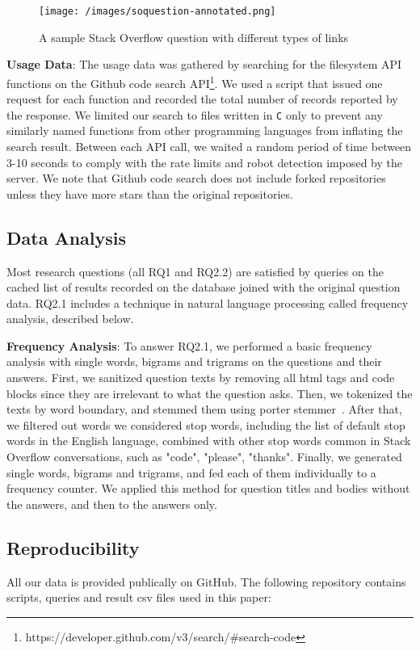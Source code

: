 \begin{figure}[t!]
  \texttt{[image: /images/soquestion-annotated.png]}
  \caption{A sample Stack Overflow question with different types of links}
  \label{fig:soq}
\end{figure}

\textbf{Usage Data}: The usage data was gathered by searching for the filesystem API functions on the Github code search API\footnote{https://developer.github.com/v3/search/\#search-code}. We used a script that issued one request for each function and recorded the total number of records reported by the response. We limited our search to files written in \texttt{C} only to prevent any similarly named functions from other programming languages from inflating the search result. Between each API call, we waited a random period of time between 3-10 seconds to comply with the rate limits and robot detection imposed by the server. We note that Github code search does not include forked repositories unless they have more stars than the original repositories.

\subsection{Data Analysis}\label{subsec:analysis}
Most research questions (all RQ1 and RQ2.2) are satisfied by queries on the cached list of results recorded on the database joined with the original question data. RQ2.1 includes a technique in natural language processing called frequency analysis, described below.

\textbf{Frequency Analysis}: To answer RQ2.1, we performed a basic frequency analysis with single words, bigrams and trigrams on the questions and their answers. First, we sanitized question texts by removing all html tags and code blocks since they are irrelevant to what the question asks. Then, we tokenized the texts by word boundary, and stemmed them using porter stemmer~\cite{Porter1980}. After that, we filtered out words we considered stop words, including the list of default stop words in the English language, combined with other stop words common in Stack Overflow conversations, such as "code", "please", "thanks". Finally, we generated single words, bigrams and trigrams, and fed each of them individually to a frequency counter. We applied this method for question titles and bodies without the answers, and then to the answers only.

\subsection{Reproducibility}\label{subsec:repr}
All our data is provided publically on GitHub. The following repository contains scripts, queries and result csv files used in this paper:

